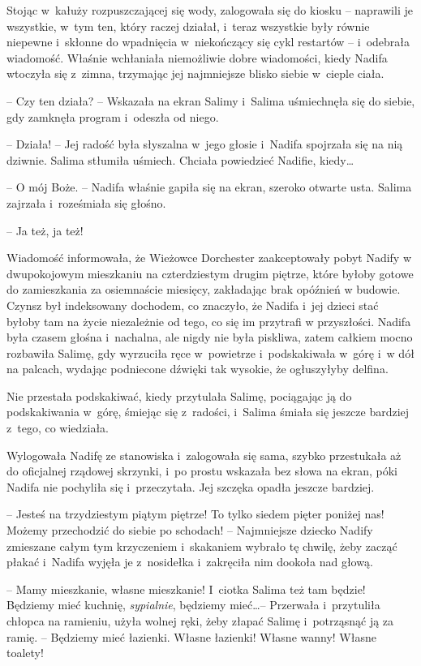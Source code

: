 \documentclass[oneside,polish,11pt,sfheadings]{mwbk}
\begin{document}
Stojąc w~kałuży rozpuszczającej się wody, zalogowała się do kiosku -- naprawili je wszystkie, w~tym ten, który raczej działał, i~teraz
wszystkie były równie niepewne i~skłonne do wpadnięcia w~niekończący się
cykl restartów -- i~odebrała wiadomość. Właśnie wchłaniała niemożliwie
dobre wiadomości, kiedy Nadifa wtoczyła się z~zimna, trzymając jej
najmniejsze blisko siebie w~cieple ciała.

-- Czy ten działa? -- Wskazała na ekran Salimy i~Salima uśmiechnęła się do
siebie, gdy zamknęła program i~odeszła od niego.

-- Działa! -- Jej radość była słyszalna w~jego głosie i~Nadifa spojrzała
się na nią dziwnie. Salima stłumiła uśmiech. Chciała powiedzieć Nadifie,
kiedy\ldots 

-- O mój Boże. -- Nadifa właśnie gapiła się na ekran, szeroko otwarte
usta. Salima zajrzała i~roześmiała się głośno.

-- Ja też, ja też!

Wiadomość informowała, że Wieżowce Dorchester zaakceptowały pobyt Nadify
w dwupokojowym mieszkaniu na czterdziestym drugim piętrze, które byłoby
gotowe do zamieszkania za osiemnaście miesięcy, zakładając brak opóźnień
w budowie. Czynsz był indeksowany dochodem, co znaczyło, że Nadifa i~jej
dzieci stać byłoby tam na życie niezależnie od tego, co się im przytrafi
w przyszłości. Nadifa była czasem głośna i~nachalna, ale nigdy nie była
piskliwa, zatem całkiem mocno rozbawiła Salimę, gdy wyrzuciła ręce w~powietrze i~podskakiwała w~górę i~w dół na palcach, wydając podniecone
dźwięki tak wysokie, że ogłuszyłyby delfina.

Nie przestała podskakiwać, kiedy przytulała Salimę, pociągając ją do
podskakiwania w~górę, śmiejąc się z~radości, i~Salima śmiała się jeszcze
bardziej z~tego, co wiedziała.

Wylogowała Nadifę ze stanowiska i~zalogowała się sama, szybko
przestukała aż do oficjalnej rządowej skrzynki, i~po prostu wskazała bez
słowa na ekran, póki Nadifa nie pochyliła się i~przeczytała. Jej szczęka
opadła jeszcze bardziej.

-- Jesteś na trzydziestym piątym piętrze! To tylko siedem pięter poniżej
nas! Możemy przechodzić do siebie po schodach! -- Najmniejsze dziecko
Nadify zmieszane całym tym krzyczeniem i~skakaniem wybrało tę chwilę,
żeby zacząć płakać i~Nadifa wyjęła je z~nosidełka i~zakręciła nim
dookoła nad głową. 

-- Mamy mieszkanie, własne mieszkanie! I~ciotka Salima
też tam będzie! Będziemy mieć kuchnię, \textit{sypialnie}, będziemy
mieć\ldots  -- Przerwała i~przytuliła chłopca na ramieniu, użyła wolnej ręki,
żeby złapać Salimę i~potrząsnąć ją za ramię. -- Będziemy mieć łazienki.
Własne łazienki! Własne wanny! Własne toalety!
\end{document}
